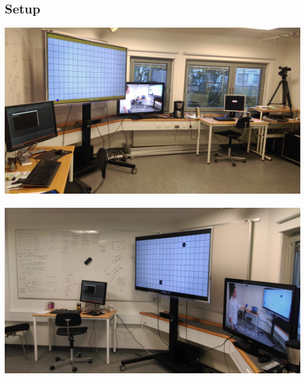 \subsection*{\pictures}

\subsection*{Setup}
\includegraphics[width=\textwidth]{docs/appendix/files/setup_left.jpg}
\\\\
\includegraphics[width=\textwidth]{docs/appendix/files/setup_right.jpg}

